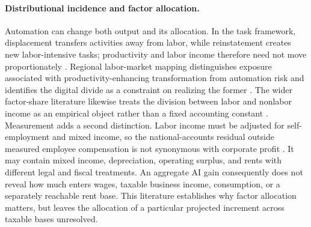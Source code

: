 \paragraph{Distributional incidence and factor allocation.}
Automation can change both output and its allocation. In the task framework, displacement transfers activities away from labor, while reinstatement creates new labor-intensive tasks; productivity and labor income therefore need not move proportionately \citep{acemoglu2018race,acemoglu2019automation}. Regional labor-market mapping distinguishes exposure associated with productivity-enhancing transformation from automation risk and identifies the digital divide as a constraint on realizing the former \citep{worldbankilo2024lacgenai}. The wider factor-share literature likewise treats the division between labor and nonlabor income as an empirical object rather than a fixed accounting constant \citep{karabarbounis2014global}. Measurement adds a second distinction. Labor income must be adjusted for self-employment and mixed income, so the national-accounts residual outside measured employee compensation is not synonymous with corporate profit \citep{gollin2002getting}. It may contain mixed income, depreciation, operating surplus, and rents with different legal and fiscal treatments. An aggregate AI gain consequently does not reveal how much enters wages, taxable business income, consumption, or a separately reachable rent base. This literature establishes why factor allocation matters, but leaves the allocation of a particular projected increment across taxable bases unresolved.

